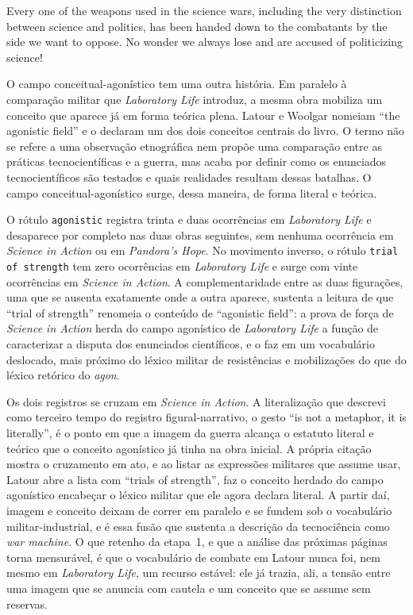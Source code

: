 \begin{citacaoabnt}
Every one of the weapons used in the science wars, including the very distinction between science and politics, has been handed down to the combatants by the side we want to oppose. No wonder we always lose and are accused of politicizing science! \parencite[p.~215]{Latour1999PandorasHope}
\end{citacaoabnt}

O campo conceitual-agonístico tem uma outra história. Em paralelo à comparação militar que \emph{Laboratory Life} introduz, a mesma obra mobiliza um conceito que aparece já em forma teórica plena. Latour e Woolgar nomeiam \enquote{the agonistic field} e o declaram um dos dois conceitos centrais do livro. O termo não se refere a uma observação etnográfica nem propõe uma comparação entre as práticas tecnocientíficas e a guerra, mas acaba por definir como os enunciados tecnocientíficos são testados e quais realidades resultam dessas batalhas. O campo conceitual-agonístico surge, dessa maneira, de forma literal e teórica.

O rótulo \texttt{agonistic} registra trinta e duas ocorrências em \emph{Laboratory Life} e desaparece por completo nas duas obras seguintes, sem nenhuma ocorrência em \emph{Science in Action} ou em \emph{Pandora's Hope}. No movimento inverso, o rótulo \texttt{trial of strength} tem zero ocorrências em \emph{Laboratory Life} e surge com vinte ocorrências em \emph{Science in Action}. A complementaridade entre as duas figurações, uma que se ausenta exatamente onde a outra aparece, sustenta a leitura de que \enquote{trial of strength} renomeia o conteúdo de \enquote{agonistic field}: a prova de força de \emph{Science in Action} herda do campo agonístico de \emph{Laboratory Life} a função de caracterizar a disputa dos enunciados científicos, e o faz em um vocabulário deslocado, mais próximo do léxico militar de resistências e mobilizações do que do léxico retórico do \emph{agon}.

Os dois registros se cruzam em \emph{Science in Action}. A literalização que descrevi como terceiro tempo do registro figural-narrativo, o gesto \enquote{is not a metaphor, it is literally}, é o ponto em que a imagem da guerra alcança o estatuto literal e teórico que o conceito agonístico já tinha na obra inicial. A própria citação mostra o cruzamento em ato, e ao listar as expressões militares que assume usar, Latour abre a lista com \enquote{trials of strength}, faz o conceito herdado do campo agonístico encabeçar o léxico militar que ele agora declara literal. A partir daí, imagem e conceito deixam de correr em paralelo e se fundem sob o vocabulário militar-industrial, e é essa fusão que sustenta a descrição da tecnociência como \textit{war machine}. O que retenho da etapa~1, e que a análise das próximas páginas torna mensurável, é que o vocabulário de combate em Latour nunca foi, nem mesmo em \emph{Laboratory Life}, um recurso estável: ele já trazia, ali, a tensão entre uma imagem que se anuncia com cautela e um conceito que se assume sem reservas.

